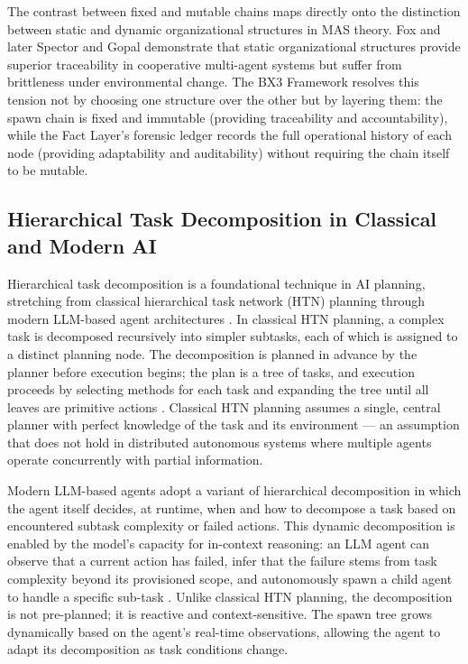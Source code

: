 The contrast between fixed and mutable chains maps directly onto the distinction between static and dynamic organizational structures in MAS theory. Fox \cite{fox1981} and later Spector and Gopal \cite{spector1994} demonstrate that static organizational structures provide superior traceability in cooperative multi-agent systems but suffer from brittleness under environmental change. The BX3 Framework resolves this tension not by choosing one structure over the other but by layering them: the spawn chain is fixed and immutable (providing traceability and accountability), while the Fact Layer's forensic ledger records the full operational history of each node (providing adaptability and auditability) without requiring the chain itself to be mutable.

\subsection{Hierarchical Task Decomposition in Classical and Modern AI}

Hierarchical task decomposition is a foundational technique in AI planning, stretching from classical hierarchical task network (HTN) planning \cite{erol1994,ghallab2004} through modern LLM-based agent architectures \cite{wei2022,shinn2023}. In classical HTN planning, a complex task is decomposed recursively into simpler subtasks, each of which is assigned to a distinct planning node. The decomposition is planned in advance by the planner before execution begins; the plan is a tree of tasks, and execution proceeds by selecting methods for each task and expanding the tree until all leaves are primitive actions \cite{ghallab2004}. Classical HTN planning assumes a single, central planner with perfect knowledge of the task and its environment — an assumption that does not hold in distributed autonomous systems where multiple agents operate concurrently with partial information.

Modern LLM-based agents adopt a variant of hierarchical decomposition in which the agent itself decides, at runtime, when and how to decompose a task based on encountered subtask complexity or failed actions. This dynamic decomposition is enabled by the model's capacity for in-context reasoning: an LLM agent can observe that a current action has failed, infer that the failure stems from task complexity beyond its provisioned scope, and autonomously spawn a child agent to handle a specific sub-task \cite{press2022,yao2022}. Unlike classical HTN planning, the decomposition is not pre-planned; it is reactive and context-sensitive. The spawn tree grows dynamically based on the agent's real-time observations, allowing the agent to adapt its decomposition as task conditions change.

